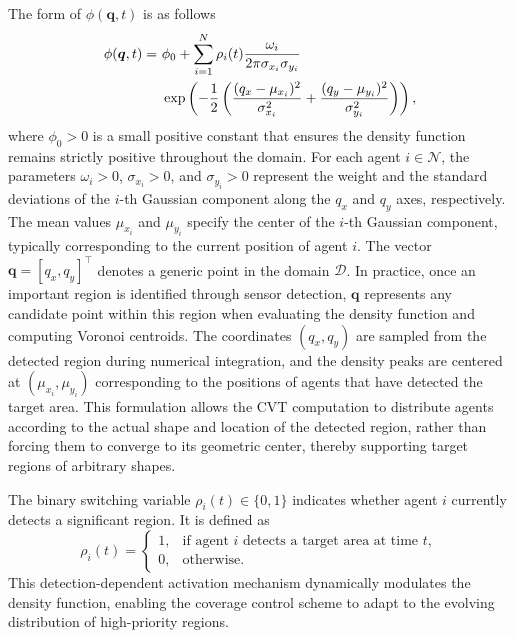\documentclass[fleqn,10pt,twocolumn]{main}
\begin{document}
The form of $\phi(\boldsymbol{q}, t)$ is as follows
\begin{align}
\label{eq6}
\phi(\boldsymbol{q}, t) =\ & \phi_0 + \sum_{i=1}^{N} \rho_i(t) \frac{\omega_i}{2\pi \sigma_{x_i} \sigma_{y_i}} \notag \\
& \exp\left( -\frac{1}{2} \left( 
\frac{(q_x - \mu_{x_i})^2}{\sigma_{x_i}^2} + 
\frac{(q_y - \mu_{y_i})^2}{\sigma_{y_i}^2} 
\right) \right),
\end{align}
where $\phi_{0} > 0$ is a small positive constant that ensures the density function remains strictly positive throughout the domain. For each agent $i \in \mathcal{N}$, the parameters $\omega_i > 0$, $\sigma_{x_i} > 0$, and $\sigma_{y_i} > 0$ represent the weight and the standard deviations of the $i$-th Gaussian component along the $q_x$ and $q_y$ axes, respectively. The mean values $\mu_{x_i}$ and $\mu_{y_i}$ specify the center of the $i$-th Gaussian component, typically corresponding to the current position of agent $i$. The vector $\boldsymbol{q} = [q_x, q_y]^{\top}$ denotes a generic point in the domain $\mathcal{D}$. In practice, once an important region is identified through sensor detection, $\boldsymbol{q}$ represents any candidate point within this region when evaluating the density function and computing Voronoi centroids. The coordinates $(q_x, q_y)$ are sampled from the detected region during numerical integration, and the density peaks are centered at $(\mu_{x_i}, \mu_{y_i})$ corresponding to the positions of agents that have detected the target area. This formulation allows the CVT computation to distribute agents according to the actual shape and location of the detected region, rather than forcing them to converge to its geometric center, thereby supporting target regions of arbitrary shapes.

The binary switching variable $\rho_i(t) \in \{0, 1\}$ indicates whether agent $i$ currently detects a significant region. It is defined as
\begin{equation}
\label{eq:rho}
\rho_i(t) =
\begin{cases}
1, & \text{if agent $i$ detects a target area at time $t$}, \\
0, & \text{otherwise}.
\end{cases}
\end{equation}
This detection-dependent activation mechanism dynamically modulates the density function, enabling the coverage control scheme to adapt to the evolving distribution of high-priority regions.
\end{document}
